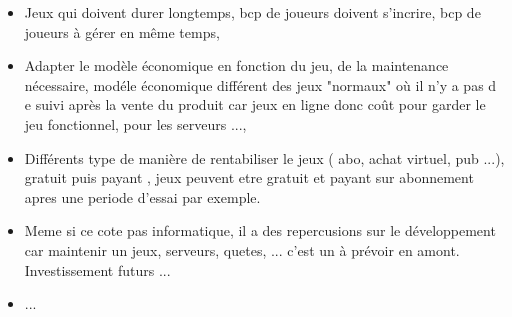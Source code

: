 \documentclass[11pt,a4paper]{article}
\begin{document}
	
  \begin{itemize}
  \renewcommand{\labelitemi}{$\Rightarrow$}
	\item Jeux qui doivent durer longtemps, bcp de joueurs doivent s'incrire, bcp de joueurs à gérer en même temps,
	\item Adapter le modèle économique en fonction du jeu, de la maintenance nécessaire, modéle économique différent des jeux "normaux" où il n'y a pas d e suivi après la vente du produit car jeux en ligne donc coût pour garder le jeu fonctionnel, pour les serveurs ...,
	\item Différents type de manière de rentabiliser le jeux ( abo, achat virtuel, pub ...), gratuit puis payant , jeux peuvent etre gratuit et payant sur abonnement apres une periode d'essai par exemple.
	\item Meme si ce cote pas informatique, il a des repercusions sur le développement car maintenir un jeux, serveurs, quetes, ... c'est un à prévoir en amont. Investissement futurs ...
	\item ...
  \end{itemize}
\end{document}
